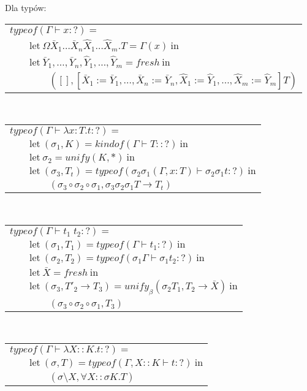 \documentclass[11pt,leqno]{article}
\begin{document}
Dla typów:\\
\begin{tabular}{l}
$typeof(\Gamma \vdash x : ?) = $ \\
$\qquad \textrm{let} \ \Omega \bar{X}_1 \dots \bar{X}_n \widehat{X}_1 \dots \widehat{X}_m.T = \Gamma(x) \ \textrm{in} $ \\
$\qquad \textrm{let} \ \bar{Y}_1, \dots, \bar{Y}_n, \widehat{Y}_1, \dots, \widehat{Y}_m = fresh \ \textrm{in} $ \\
$\qquad\qquad ([], [\bar{X}_1 := \bar{Y}_1, \dots ,\bar{X}_n := \bar{Y}_n,\widehat{X}_1 := \widehat{Y}_1, \dots ,\widehat{X}_m := \widehat{Y}_m]T) $ \\
\end{tabular} \\
\begin{tabular}{l}
$typeof(\Gamma \vdash \lambda x:T.t : ?) = $ \\
$\qquad \textrm{let} \ (\sigma_1, K) = kindof(\Gamma \vdash T :: ?) \ \textrm{in} $ \\
$\qquad \textrm{let} \ \sigma_2 = unify(K, *) \ \textrm{in} $ \\
$\qquad \textrm{let} \ (\sigma_3, T_t) = typeof(\sigma_2 \sigma_1(\Gamma, x:T) \vdash \sigma_2 \sigma_1 t : ?) \ \textrm{in} $ \\
$\qquad\qquad (\sigma_3 \circ \sigma_2 \circ \sigma_1, \sigma_3 \sigma_2 \sigma_1 T \rightarrow T_t) $ \\
\end{tabular} \\
\begin{tabular}{l}
$typeof(\Gamma \vdash t_1 \; t_2 : ?) = $ \\
$\qquad \textrm{let} \ (\sigma_1, T_1) = typeof(\Gamma \vdash t_1 : ?) \ \textrm{in} $ \\
$\qquad \textrm{let} \ (\sigma_2, T_2) = typeof(\sigma_1 \Gamma \vdash \sigma_1 t_2 : ?) \ \textrm{in} $ \\
$\qquad \textrm{let} \ \bar{X} = fresh \ \textrm{in} $ \\
$\qquad \textrm{let} \ (\sigma_3, T'_2 \to T_3) = unify_\beta(\sigma_2 T_1, T_2 \rightarrow \bar{X}) \ \textrm{in} $ \\
$\qquad\qquad (\sigma_3 \circ \sigma_2 \circ \sigma_1, T_3) $ \\
\end{tabular} \\
\begin{tabular}{l}
$typeof(\Gamma \vdash \lambda X::K.t : ?) = $ \\
$\qquad \textrm{let} \ (\sigma, T) = typeof(\Gamma, X::K \vdash t : ?) \ \textrm{in} $ \\
$\qquad\qquad (\sigma \setminus X, \forall X::\sigma K.T) $ \\
\end{tabular} \\
\end{document}
